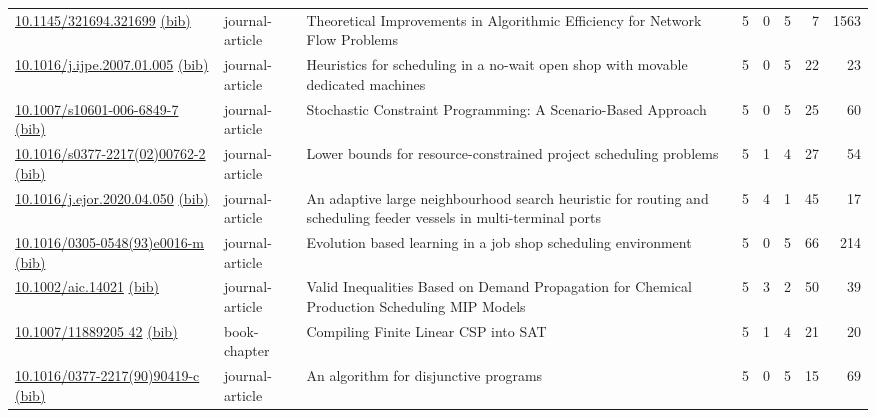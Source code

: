 {\begin{longtable}{p{5cm}lp{11cm}rrrrr}
\href{http://dx.doi.org/10.1145/321694.321699}{10.1145/321694.321699} \href{https://www.doi2bib.org/bib/10.1145/321694.321699}{(bib)} & journal-article & Theoretical Improvements in Algorithmic Efficiency for Network Flow Problems & 5 & 0 & 5 & 7 & 1563 \\
\href{http://dx.doi.org/10.1016/j.ijpe.2007.01.005}{10.1016/j.ijpe.2007.01.005} \href{https://www.doi2bib.org/bib/10.1016/j.ijpe.2007.01.005}{(bib)} & journal-article & Heuristics for scheduling in a no-wait open shop with movable dedicated machines & 5 & 0 & 5 & 22 & 23 \\
\href{http://dx.doi.org/10.1007/s10601-006-6849-7}{10.1007/s10601-006-6849-7} \href{https://www.doi2bib.org/bib/10.1007/s10601-006-6849-7}{(bib)} & journal-article & Stochastic Constraint Programming: A Scenario-Based Approach & 5 & 0 & 5 & 25 & 60 \\
\href{http://dx.doi.org/10.1016/s0377-2217(02)00762-2}{10.1016/s0377-2217(02)00762-2} \href{https://www.doi2bib.org/bib/10.1016/s0377-2217(02)00762-2}{(bib)} & journal-article & Lower bounds for resource-constrained project scheduling problems & 5 & 1 & 4 & 27 & 54 \\
\href{http://dx.doi.org/10.1016/j.ejor.2020.04.050}{10.1016/j.ejor.2020.04.050} \href{https://www.doi2bib.org/bib/10.1016/j.ejor.2020.04.050}{(bib)} & journal-article & An adaptive large neighbourhood search heuristic for routing and scheduling feeder vessels in multi-terminal ports & 5 & 4 & 1 & 45 & 17 \\
\href{http://dx.doi.org/10.1016/0305-0548(93)e0016-m}{10.1016/0305-0548(93)e0016-m} \href{https://www.doi2bib.org/bib/10.1016/0305-0548(93)e0016-m}{(bib)} & journal-article & Evolution based learning in a job shop scheduling environment & 5 & 0 & 5 & 66 & 214 \\
\href{http://dx.doi.org/10.1002/aic.14021}{10.1002/aic.14021} \href{https://www.doi2bib.org/bib/10.1002/aic.14021}{(bib)} & journal-article & Valid Inequalities Based on Demand Propagation for Chemical Production Scheduling MIP Models & 5 & 3 & 2 & 50 & 39 \\
\href{http://dx.doi.org/10.1007/11889205_42}{10.1007/11889205 42} \href{https://www.doi2bib.org/bib/10.1007/11889205_42}{(bib)} & book-chapter & Compiling Finite Linear CSP into SAT & 5 & 1 & 4 & 21 & 20 \\
\href{http://dx.doi.org/10.1016/0377-2217(90)90419-c}{10.1016/0377-2217(90)90419-c} \href{https://www.doi2bib.org/bib/10.1016/0377-2217(90)90419-c}{(bib)} & journal-article & An algorithm for disjunctive programs & 5 & 0 & 5 & 15 & 69 \\

\end{longtable}}
